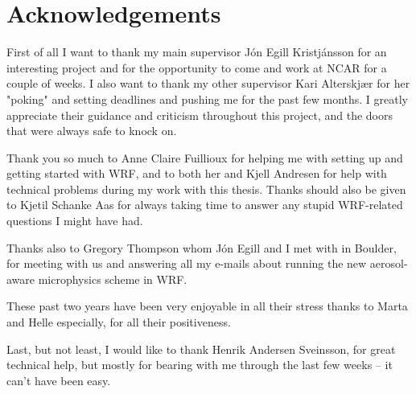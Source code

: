 \chapter*{Acknowledgements}

First of all I want to thank my main supervisor Jón Egill Kristjánsson for an interesting project and for the opportunity to come and work at NCAR for a couple of weeks. I also want to thank my other supervisor Kari Alterskjær for her "poking" and setting deadlines and pushing me for the past few months. I greatly appreciate their guidance and criticism throughout this project, and the doors that were always safe to knock on. 

Thank you so much to Anne Claire Fuillioux for helping me with setting up and getting started with WRF, and to both her and Kjell Andresen for help with technical problems during my work with this thesis. Thanks should also be given to Kjetil Schanke Aas for always taking time to answer any stupid WRF-related questions I might have had.

Thanks also to Gregory Thompson whom Jón Egill and I met with in Boulder, for meeting with us and answering all my e-mails about running the new aerosol-aware microphysics scheme in WRF.

These past two years have been very enjoyable in all their stress thanks to Marta and Helle especially, for all their positiveness.

Last, but not least, I would like to thank Henrik Andersen Sveinsson, for great technical help, but mostly for bearing with me through the last few weeks -- it can't have been easy.
